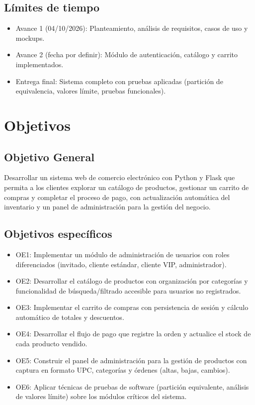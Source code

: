 \documentclass[12pt,a4paper]{article}
\begin{document}
\subsection{Límites de tiempo}
\begin{itemize}[label=--]
    \item Avance 1 (04/10/2026): Planteamiento, análisis de requisitos, casos de uso y mockups.
    \item Avance 2 (fecha por definir): Módulo de autenticación, catálogo y carrito implementados.
    \item Entrega final: Sistema completo con pruebas aplicadas (partición de equivalencia, valores límite, pruebas funcionales).
\end{itemize}


\section{Objetivos}

\subsection{Objetivo General}
Desarrollar un sistema web de comercio electrónico con Python y Flask que permita
a los clientes explorar un catálogo de productos, gestionar un carrito de compras y
completar el proceso de pago, con actualización automática del inventario y un
panel de administración para la gestión del negocio.

\subsection{Objetivos específicos}
\begin{itemize}[label=--]
    \item OE1: Implementar un módulo de administración de usuarios con roles diferenciados (invitado, cliente estándar, cliente VIP, administrador).
    \item OE2: Desarrollar el catálogo de productos con organización por categorías y funcionalidad de búsqueda/filtrado accesible para usuarios no registrados.
    \item OE3: Implementar el carrito de compras con persistencia de sesión y cálculo automático de totales y descuentos.
    \item OE4: Desarrollar el flujo de pago que registre la orden y actualice el stock de cada producto vendido.
    \item OE5: Construir el panel de administración para la gestión de productos con captura en formato UPC, categorías y órdenes (altas, bajas, cambios).
    \item OE6: Aplicar técnicas de pruebas de software (partición equivalente, análisis de valores límite) sobre los módulos críticos del sistema.
\end{itemize}
\end{document}
